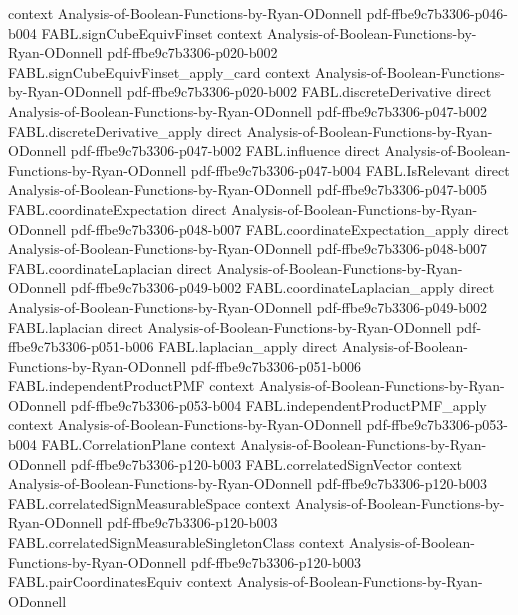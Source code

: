 \begin{theorem}
  {context}
  {Analysis-of-Boolean-Functions-by-Ryan-ODonnell}
  {pdf-ffbe9c7b3306-p046-b004}
\proofstep
  {FABL.signCubeEquivFinset}
  {context}
  {Analysis-of-Boolean-Functions-by-Ryan-ODonnell}
  {pdf-ffbe9c7b3306-p020-b002}
\proofstep
  {FABL.signCubeEquivFinset_apply_card}
  {context}
  {Analysis-of-Boolean-Functions-by-Ryan-ODonnell}
  {pdf-ffbe9c7b3306-p020-b002}
\proofstep
  {FABL.discreteDerivative}
  {direct}
  {Analysis-of-Boolean-Functions-by-Ryan-ODonnell}
  {pdf-ffbe9c7b3306-p047-b002}
\proofstep
  {FABL.discreteDerivative_apply}
  {direct}
  {Analysis-of-Boolean-Functions-by-Ryan-ODonnell}
  {pdf-ffbe9c7b3306-p047-b002}
\proofstep
  {FABL.influence}
  {direct}
  {Analysis-of-Boolean-Functions-by-Ryan-ODonnell}
  {pdf-ffbe9c7b3306-p047-b004}
\proofstep
  {FABL.IsRelevant}
  {direct}
  {Analysis-of-Boolean-Functions-by-Ryan-ODonnell}
  {pdf-ffbe9c7b3306-p047-b005}
\proofstep
  {FABL.coordinateExpectation}
  {direct}
  {Analysis-of-Boolean-Functions-by-Ryan-ODonnell}
  {pdf-ffbe9c7b3306-p048-b007}
\proofstep
  {FABL.coordinateExpectation_apply}
  {direct}
  {Analysis-of-Boolean-Functions-by-Ryan-ODonnell}
  {pdf-ffbe9c7b3306-p048-b007}
\proofstep
  {FABL.coordinateLaplacian}
  {direct}
  {Analysis-of-Boolean-Functions-by-Ryan-ODonnell}
  {pdf-ffbe9c7b3306-p049-b002}
\proofstep
  {FABL.coordinateLaplacian_apply}
  {direct}
  {Analysis-of-Boolean-Functions-by-Ryan-ODonnell}
  {pdf-ffbe9c7b3306-p049-b002}
\proofstep
  {FABL.laplacian}
  {direct}
  {Analysis-of-Boolean-Functions-by-Ryan-ODonnell}
  {pdf-ffbe9c7b3306-p051-b006}
\proofstep
  {FABL.laplacian_apply}
  {direct}
  {Analysis-of-Boolean-Functions-by-Ryan-ODonnell}
  {pdf-ffbe9c7b3306-p051-b006}
\proofstep
  {FABL.independentProductPMF}
  {context}
  {Analysis-of-Boolean-Functions-by-Ryan-ODonnell}
  {pdf-ffbe9c7b3306-p053-b004}
\proofstep
  {FABL.independentProductPMF_apply}
  {context}
  {Analysis-of-Boolean-Functions-by-Ryan-ODonnell}
  {pdf-ffbe9c7b3306-p053-b004}
\proofstep
  {FABL.CorrelationPlane}
  {context}
  {Analysis-of-Boolean-Functions-by-Ryan-ODonnell}
  {pdf-ffbe9c7b3306-p120-b003}
\proofstep
  {FABL.correlatedSignVector}
  {context}
  {Analysis-of-Boolean-Functions-by-Ryan-ODonnell}
  {pdf-ffbe9c7b3306-p120-b003}
\proofstep
  {FABL.correlatedSignMeasurableSpace}
  {context}
  {Analysis-of-Boolean-Functions-by-Ryan-ODonnell}
  {pdf-ffbe9c7b3306-p120-b003}
\proofstep
  {FABL.correlatedSignMeasurableSingletonClass}
  {context}
  {Analysis-of-Boolean-Functions-by-Ryan-ODonnell}
  {pdf-ffbe9c7b3306-p120-b003}
\proofstep
  {FABL.pairCoordinatesEquiv}
  {context}
  {Analysis-of-Boolean-Functions-by-Ryan-ODonnell}

\end{theorem}

